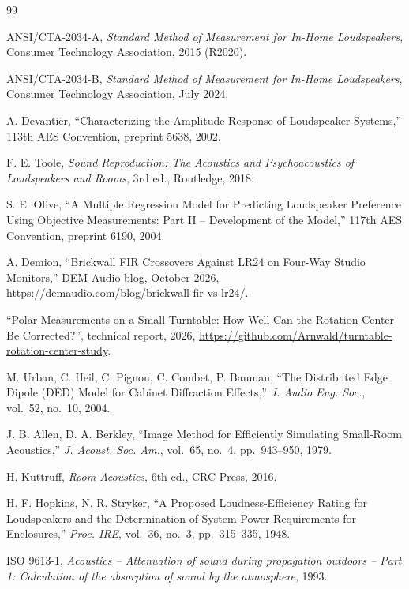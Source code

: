 \documentclass[11pt,a4paper]{article}
\begin{document}
\begin{thebibliography}{99}

 ANSI/CTA-2034-A, \emph{Standard Method of Measurement for In-Home Loudspeakers},
Consumer Technology Association, 2015 (R2020).

 ANSI/CTA-2034-B, \emph{Standard Method of Measurement for In-Home Loudspeakers},
Consumer Technology Association, July 2024.

 A. Devantier, ``Characterizing the Amplitude Response of Loudspeaker Systems,''
113th AES Convention, preprint 5638, 2002.

 F. E. Toole, \emph{Sound Reproduction: The Acoustics and Psychoacoustics of
Loudspeakers and Rooms}, 3rd ed., Routledge, 2018.

 S. E. Olive, ``A Multiple Regression Model for Predicting Loudspeaker Preference
Using Objective Measurements: Part II -- Development of the Model,'' 117th AES Convention, preprint
6190, 2004.

 A. Demion, ``Brickwall FIR Crossovers Against LR24 on Four-Way Studio Monitors,''
DEM Audio blog, October 2026, \url{https://demaudio.com/blog/brickwall-fir-vs-lr24/}.

 ``Polar Measurements on a Small Turntable: How Well Can the Rotation Center Be
Corrected?'', technical report, 2026, \url{https://github.com/Arnwald/turntable-rotation-center-study}.

 M. Urban, C. Heil, C. Pignon, C. Combet, P. Bauman, ``The Distributed Edge Dipole
(DED) Model for Cabinet Diffraction Effects,'' \emph{J. Audio Eng. Soc.}, vol.~52, no.~10, 2004.

 J. B. Allen, D. A. Berkley, ``Image Method for Efficiently Simulating Small-Room
Acoustics,'' \emph{J. Acoust. Soc. Am.}, vol.~65, no.~4, pp.~943--950, 1979.

 H. Kuttruff, \emph{Room Acoustics}, 6th ed., CRC Press, 2016.

 H. F. Hopkins, N. R. Stryker, ``A Proposed Loudness-Efficiency Rating for
Loudspeakers and the Determination of System Power Requirements for Enclosures,'' \emph{Proc. IRE},
vol.~36, no.~3, pp.~315--335, 1948.

 ISO 9613-1, \emph{Acoustics -- Attenuation of sound during propagation outdoors --
Part 1: Calculation of the absorption of sound by the atmosphere}, 1993.


\end{thebibliography}
\end{document}
